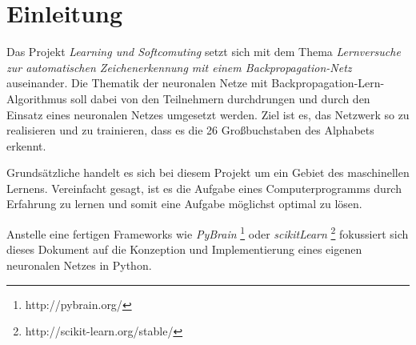 \chapter{Einleitung}
Das Projekt \emph{Learning und Softcomuting} setzt sich mit dem Thema \emph{Lernversuche zur automatischen Zeichenerkennung mit einem Backpropagation-Netz} auseinander. Die Thematik der neuronalen Netze mit Backpropagation-Lern-Algorithmus soll dabei von den Teilnehmern durchdrungen und durch den Einsatz eines neuronalen Netzes umgesetzt werden. Ziel ist es, das Netzwerk so zu realisieren und zu trainieren, dass es die 26 Großbuchstaben des Alphabets erkennt. 

Grundsätzliche handelt es sich bei diesem Projekt um ein Gebiet des maschinellen Lernens. Vereinfacht gesagt, ist es die Aufgabe eines Computerprogramms durch Erfahrung zu lernen und somit eine Aufgabe möglichst optimal zu lösen.

Anstelle eine fertigen Frameworks wie \emph{PyBrain} \footnote{http://pybrain.org/} oder \emph{scikitLearn} \footnote{http://scikit-learn.org/stable/} fokussiert sich dieses Dokument auf die Konzeption und Implementierung eines eigenen neuronalen Netzes in Python. 